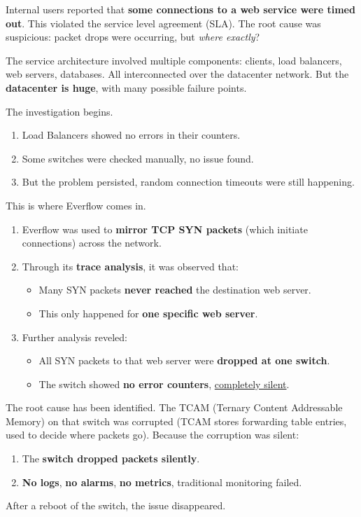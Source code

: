 \begin{examplebox}
    Internal users reported that \textbf{some connections to a web service were timed out}. This violated the service level agreement (SLA). The root cause was suspicious: packet drops were occurring, but \emph{where exactly}?

    \highspace
    The service architecture involved multiple components: clients, load balancers, web servers, databases. All interconnected over the datacenter network. But the \textbf{datacenter is huge}, with many possible failure points.

    \highspace
    The investigation begins.
    \begin{enumerate}
        \item Load Balancers showed no errors in their counters.
        \item Some switches were checked manually, no issue found.
        \item But the problem persisted, random connection timeouts were still happening.
    \end{enumerate}

    \highspace
    This is where Everflow comes in.
    \begin{enumerate}
        \item Everflow was used to \textbf{mirror TCP SYN packets} (which initiate connections) across the network.
        \item Through its \textbf{trace analysis}, it was observed that:
        \begin{itemize}
            \item Many SYN packets \textbf{never reached} the destination web server.
            \item This only happened for \textbf{one specific web server}.
        \end{itemize}
        \item Further analysis reveled:
        \begin{itemize}
            \item All SYN packets to that web server were \textbf{dropped at one switch}.
            \item The switch showed \textbf{no error counters}, \underline{completely silent}.
        \end{itemize}
    \end{enumerate}

    \highspace
    The root cause has been identified. The TCAM (Ternary Content Addressable Memory) on that switch was corrupted (TCAM stores forwarding table entries, used to decide where packets go). Because the corruption was silent:
    \begin{enumerate}
        \item The \textbf{switch dropped packets silently}.
        \item \textbf{No logs}, \textbf{no alarms}, \textbf{no metrics}, traditional monitoring failed.
    \end{enumerate}
    After a reboot of the switch, the issue disappeared.
\end{examplebox}
